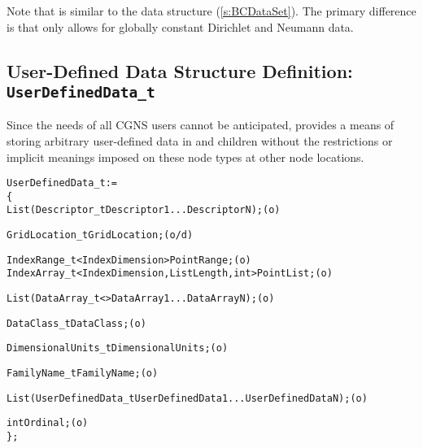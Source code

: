 Note that  is similar to the data structure
 (\autoref{s:BCDataSet}).  The primary difference is that
 only allows for globally constant Dirichlet and
Neumann data.

\subsection{User-Defined Data Structure Definition: \texttt{UserDefinedData\_t}}
\label{s:UserDefinedData}

Since the needs of all CGNS users cannot be anticipated,
 provides a means of storing arbitrary
user-defined data in  and 
children without the restrictions or implicit meanings imposed on these
node types at other node locations.

\begin{alltt}
  UserDefinedData\_t :=
    \{
    List( Descriptor\_t Descriptor1 ... DescriptorN ) ;                      (o)

    GridLocation\_t GridLocation ;                                           (o/d)

    IndexRange\_t<IndexDimension> PointRange ;                               (o)
    IndexArray\_t<IndexDimension, ListLength, int> PointList ;               (o)

    List( DataArray\_t<> DataArray1 ... DataArrayN ) ;                       (o)

    DataClass\_t DataClass ;                                                 (o)

    DimensionalUnits\_t DimensionalUnits ;                                   (o)

    FamilyName\_t FamilyName ;                                               (o)

    List( UserDefinedData\_t UserDefinedData1 ... UserDefinedDataN ) ;       (o)

    int Ordinal ;                                                           (o)
    \} ;
\end{alltt}

